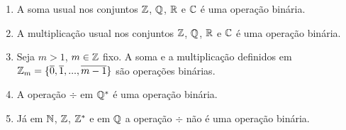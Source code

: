 \documentclass{beamer}
\begin{document}
    \begin{frame}
        \begin{exemplos}
            \begin{enumerate}[label={\arabic*})]
                \item A soma usual nos conjuntos $\mathbb{Z}$, $\mathbb{Q}$, $\mathbb{R}$ e $\mathbb{C}$ {\'e} uma opera{\c c}{\~a}o bin{\'a}ria.

                \vspace{.3cm}

                \item A multiplica\c{c}\~ao usual nos conjuntos $\mathbb{Z}$, $\mathbb{Q}$, $\mathbb{R}$ e $\mathbb{C}$ {\'e} uma opera{\c c}{\~a}o bin{\'a}ria.

                \vspace{.3cm}

                \item Seja $m > 1$, $m \in \mathbb{Z}$ fixo. A soma e a multiplica\c{c}\~ao definidos em $\mathbb{Z}_m = \{\overline{0},\overline{1},...,\overline{m-1}\}$ s\~ao opera\c{c}\~oes bin\'arias.
                
                \vspace{.3cm}

                \item A opera\c{c}\~ao $\div$ em $\mathbb{Q}^{*}$ {\'e} uma opera{\c c}{\~a}o bin{\'a}ria.
                
                \vspace{.3cm}

                \item J\'a em $\mathbb{N}$, $\mathbb{Z}$, $\mathbb{Z}^{*}$ e em $\mathbb{Q}$ a opera\c{c}\~ao $\div$ n{\~a}o {\'e} uma opera{\c c}{\~a}o bin{\'a}ria.
                
                \vspace{.3cm}

            \end{enumerate}
        \end{exemplos}
    \end{frame}
\end{document}
